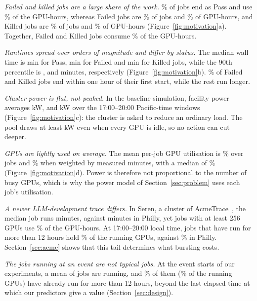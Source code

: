 \emph{Failed and killed jobs are a large share of the work.} \MotJobsharePassPct\% of jobs end as Pass and use \MotGpuhsharePassPct\% of the GPU-hours, whereas Failed jobs are \MotJobshareFailedPct\% of jobs and \MotGpuhshareFailedPct\% of GPU-hours, and Killed jobs are \MotJobshareKilledPct\% of jobs and \MotGpuhshareKilledPct\% of GPU-hours (Figure~\ref{fig:motivation}a). Together, Failed and Killed jobs consume \MotGpuhshareFailkillPct\% of the GPU-hours.

\emph{Runtimes spread over orders of magnitude and differ by status.} The median wall time is \MotWallMedianPassMin{} min for Pass, \MotWallMedianFailedMin{} min for Failed and \MotWallMedianKilledMin{} min for Killed jobs, while the 90th percentile is \MotWallPNineZeroPassMin{}, \MotWallPNineZeroFailedMin{} and \MotWallPNineZeroKilledMin{} minutes, respectively (Figure~\ref{fig:motivation}b). \MotWithinOnehFailkillPct\% of Failed and Killed jobs end within one hour of their first start, while the rest run longer.

\emph{Cluster power is flat, not peaked.} In the baseline simulation, facility power averages \MotPowerMeanKw{} kW, and \MotPowerEveningMeanKw{} kW over the 17:00--20:00 Pacific-time windows (Figure~\ref{fig:motivation}c): the cluster is asked to reduce an ordinary load. The pool draws at least \MotPowerIdleFloorKw{} kW even when every GPU is idle, so no action can cut deeper.

\emph{GPUs are lightly used on average.} The mean per-job GPU utilisation is \MotUtilMeanJobweightedPct\% over jobs and \MotUtilMeanMinuteweightedPct\% when weighted by measured minutes, with a median of \MotUtilMedianPct\% (Figure~\ref{fig:motivation}d). Power is therefore not proportional to the number of busy GPUs, which is why the power model of Section~\ref{sec:problem} uses each job's utilisation.

\emph{A newer LLM-development trace differs.} In Seren, a cluster of AcmeTrace~\cite{hu24}, the median job runs \AcmeMotSerenWallMedianMin{} minutes, against \AcmeMotPhillyWallMedianMin{} minutes in Philly, yet jobs with at least 256 GPUs use \AcmeMotSerenGpuhShareGeTwoFiveSixPct\% of the GPU-hours. At 17:00--20:00 local time, jobs that have run for more than 12 hours hold \AcmeMotSerenEveningLongGpuSharePct\% of the running GPUs, against \AcmeMotPhillyEveningLongGpuSharePct\% in Philly. Section~\ref{sec:acme} shows that this tail determines what bursting costs.

\emph{The jobs running at an event are not typical jobs.} At the \MotEventStarts{} event starts of our experiments, a mean of \MotRunningJobsAtStartsMean{} jobs are running, and \MotRunningBeyondGridJobsPct\% of them (\MotRunningBeyondGridGpusPct\% of the running GPUs) have already run for more than 12 hours, beyond the last elapsed time at which our predictors give a value (Section~\ref{sec:design}).
